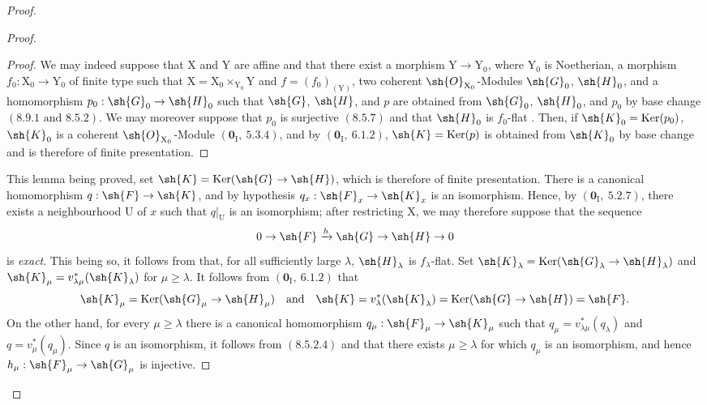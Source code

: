 \begin{proof}
\begin{proof}
\begin{proof}
We may indeed suppose that $\mathrm{X}$ and $\mathrm{Y}$ are affine and that there exist a morphism $\mathrm{Y}\to\mathrm{Y}_0$, where $\mathrm{Y}_0$ is Noetherian, a morphism $f_0:\mathrm{X}_0\to\mathrm{Y}_0$ of finite type such that $\mathrm{X}=\mathrm{X}_0\times_{\mathrm{Y}_0}\mathrm{Y}$ and $f=(f_0)_{(\mathrm{Y})}$, two coherent $\sh{O}_{\mathrm{X}_0}$-Modules $\sh{G}_0$, $\sh{H}_0$, and a homomorphism $p_0:\sh{G}_0\to\sh{H}_0$ such that $\sh{G}$, $\sh{H}$, and $p$ are obtained from $\sh{G}_0$, $\sh{H}_0$, and $p_0$ by base change $(8.9.1\text{ and }8.5.2)$. We may moreover suppose that $p_0$ is surjective $(8.5.7)$ and that $\sh{H}_0$ is $f_0$-flat . Then, if $\sh{K}_0=\operatorname{Ker}(p_0)$, $\sh{K}_0$ is a coherent $\sh{O}_{\mathrm{X}_0}$-Module $(\mathbf{0}_\mathrm{I},~5.3.4)$, and by $(\mathbf{0}_\mathrm{I},~6.1.2)$, $\sh{K}=\operatorname{Ker}(p)$ is obtained from $\sh{K}_0$ by base change and is therefore of finite presentation.
\end{proof}

This lemma being proved, set $\sh{K}=\operatorname{Ker}(\sh{G}\to\sh{H})$, which is therefore of finite presentation. There is a canonical homomorphism $q:\sh{F}\to\sh{K}$, and by hypothesis $q_x:\sh{F}_x\to\sh{K}_x$ is an isomorphism. Hence, by $(\mathbf{0}_\mathrm{I},~5.2.7)$, there exists a neighbourhood $\mathrm{U}$ of $x$ such that $q|_{\mathrm{U}}$ is an isomorphism; after restricting $\mathrm{X}$, we may therefore suppose that the sequence
\[
  0\to\sh{F}\xrightarrow{h}\sh{G}\to\sh{H}\to 0
\]
is \emph{exact}. This being so, it follows from  that, for all sufficiently large $\lambda$, $\sh{H}_\lambda$ is $f_\lambda$-flat. Set $\sh{K}_\lambda=\operatorname{Ker}(\sh{G}_\lambda\to\sh{H}_\lambda)$ and $\sh{K}_\mu=v^*_{\lambda\mu}(\sh{K}_\lambda)$ for $\mu\geqslant\lambda$. It follows from $(\mathbf{0}_\mathrm{I},~6.1.2)$ that
\[
  \sh{K}_\mu=\operatorname{Ker}(\sh{G}_\mu\to\sh{H}_\mu)
  \quad\text{and}\quad
  \sh{K}=v^*_\lambda(\sh{K}_\lambda)
  =\operatorname{Ker}(\sh{G}\to\sh{H})=\sh{F}.
\]
On the other hand, for every $\mu\geqslant\lambda$ there is a canonical homomorphism $q_\mu:\sh{F}_\mu\to\sh{K}_\mu$ such that $q_\mu=v^*_{\lambda\mu}(q_\lambda)$ and $q=v^*_\mu(q_\mu)$. Since $q$ is an isomorphism, it follows from $(8.5.2.4)$ and  that there exists $\mu\geqslant\lambda$ for which $q_\mu$ is an isomorphism, and hence $h_\mu:\sh{F}_\mu\to\sh{G}_\mu$ is injective.
\end{proof}


\end{proof}
